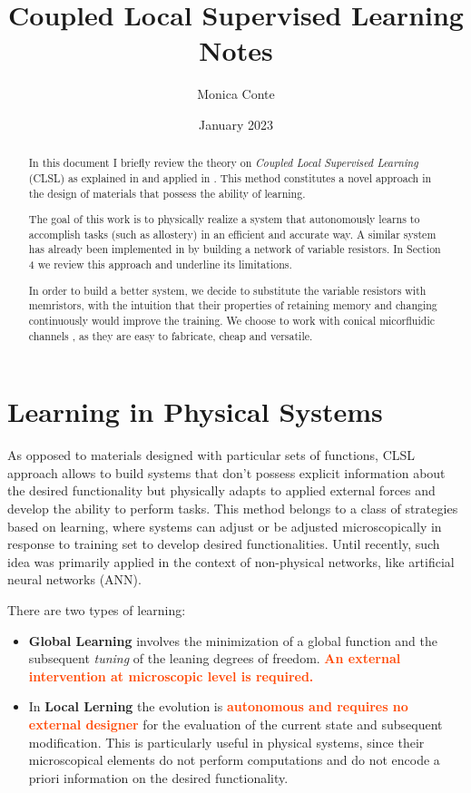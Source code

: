 \documentclass[10.5pt]{article}
\title{Coupled Local Supervised Learning Notes}
\author{Monica Conte}
\date{January 2023}
\newcommand{\important}[1]{\textcolor{OrangeRed}{\bf{#1}}}
\begin{document}
\captionsetup{width=0.93\textwidth}

\maketitle

\renewcommand{\abstractname}{}
\begin{abstract}
    In this document I briefly review the theory on \textit{Coupled Local Supervised Learning} (CLSL) as explained in \cite{Stern} and applied in \cite{Dillavou}. This method constitutes a novel approach in the design of materials that possess the ability of learning.
    
    The goal of this work is to physically realize a system that autonomously learns to accomplish tasks (such as allostery) in an efficient and accurate way. A similar system has already been implemented in \cite{Dillavou} by building a network of variable resistors. In Section 4 we review this approach and underline its limitations.
    
    In order to build a better system, we decide to substitute the variable resistors with memristors, with the intuition that their properties of retaining memory and changing continuously would improve the training. We choose to work with conical micorfluidic channels \cite{cone1}, as they are easy to fabricate, cheap and versatile.

\end{abstract}

\tableofcontents


\newpage

\section{Learning in Physical Systems}

As opposed to materials designed with particular sets of functions, CLSL approach allows to build systems that don't possess explicit information about the desired functionality but physically adapts to applied external forces and develop the ability to perform tasks. This method belongs to a class of strategies based on learning, where systems can adjust or be adjusted microscopically in response to training set to develop desired functionalities. Until recently, such idea was primarily applied in the context of non-physical networks, like artificial neural networks (ANN).

There are two types of learning:
\begin{itemize}
\item \textbf{Global Learning} involves the minimization of a global function and the subsequent \textit{tuning} of the leaning degrees of freedom. \important{An external intervention at microscopic level is required.} 
\item In \textbf{Local Lerning} the evolution is \important{autonomous and requires no external designer} for the evaluation of the current state and subsequent modification. This is particularly useful in physical systems, since their microscopical elements do not perform computations and do not encode a priori information on the desired functionality. 
\end{itemize}
\end{document}
